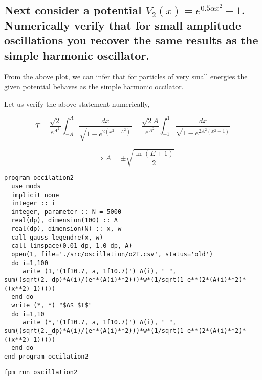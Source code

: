 \documentclass[a4paper,11pt,twoside]{article}
\begin{document}
\subsection{Next consider a potential \(V_2(x) = e^{0.5αx^2 } -1\). Numerically verify that for small amplitude oscillations you recover the same results as the simple harmonic oscillator.}
\label{sec:org93ec037}

\begin{center}
\end{center}

From the above plot, we can infer that for particles of very small energies the given potential behaves as the simple harmonic occilator.

Let us verify the above statement numerically,

$$
T =\frac{\sqrt2}{e^{A^2}} \int _{-A}^{A} \frac{dx}{\sqrt{1-e^{2(x^2-A^2)}}} = \frac{\sqrt2A}{e^{A^2}} \int _{-1}^{1} \frac{dx}{\sqrt{1-e^{2A^2(x^2-1)}}}
$$

$$
\implies A = \pm \sqrt{\frac{\ln{(E+1)}}{2}}
$$

\clearpage

\begin{verbatim}
program occilation2
  use mods
  implicit none
  integer :: i
  integer, parameter :: N = 5000
  real(dp), dimension(100) :: A
  real(dp), dimension(N) :: x, w
  call gauss_legendre(x, w)
  call linspace(0.01_dp, 1.0_dp, A)
  open(1, file='./src/oscillation/o2T.csv', status='old')
  do i=1,100
     write (1,'(1f10.7, a, 1f10.7)') A(i), " ", sum((sqrt(2._dp)*A(i)/(e**(A(i)**2)))*w*(1/sqrt(1-e**(2*(A(i)**2)*((x**2)-1)))))
  end do
  write (*, *) "$A$ $T$"
  do i=1,10
     write (*,'(1f10.7, a, 1f10.7)') A(i), " ", sum((sqrt(2._dp)*A(i)/(e**(A(i)**2)))*w*(1/sqrt(1-e**(2*(A(i)**2)*((x**2)-1)))))
  end do
end program occilation2
\end{verbatim}


\begin{verbatim}
fpm run oscillation2
\end{verbatim}
\end{document}
